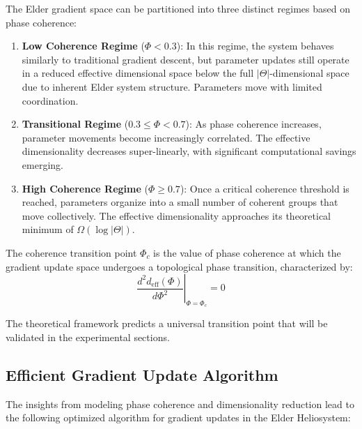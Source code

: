 The Elder gradient space can be partitioned into three distinct regimes based on phase coherence:

\begin{enumerate}
    \item \textbf{Low Coherence Regime} ($\Phi < 0.3$): In this regime, the system behaves similarly to traditional gradient descent, but parameter updates still operate in a reduced effective dimensional space below the full $|\Theta|$-dimensional space due to inherent Elder system structure. Parameters move with limited coordination.
    
    \item \textbf{Transitional Regime} ($0.3 \leq \Phi < 0.7$): As phase coherence increases, parameter movements become increasingly correlated. The effective dimensionality decreases super-linearly, with significant computational savings emerging.
    
    \item \textbf{High Coherence Regime} ($\Phi \geq 0.7$): Once a critical coherence threshold is reached, parameters organize into a small number of coherent groups that move collectively. The effective dimensionality approaches its theoretical minimum of $\Omega(\log|\Theta|)$.
\end{enumerate}

\begin{definition}
The coherence transition point $\Phi_c$ is the value of phase coherence at which the gradient update space undergoes a topological phase transition, characterized by:
\begin{equation}
\left. \frac{d^2 d_{\text{eff}}(\Phi)}{d\Phi^2} \right|_{\Phi=\Phi_c} = 0
\end{equation}
\end{definition}

The theoretical framework predicts a universal transition point that will be validated in the experimental sections.



\subsection{Efficient Gradient Update Algorithm}

The insights from modeling phase coherence and dimensionality reduction lead to the following optimized algorithm for gradient updates in the Elder Heliosystem:


